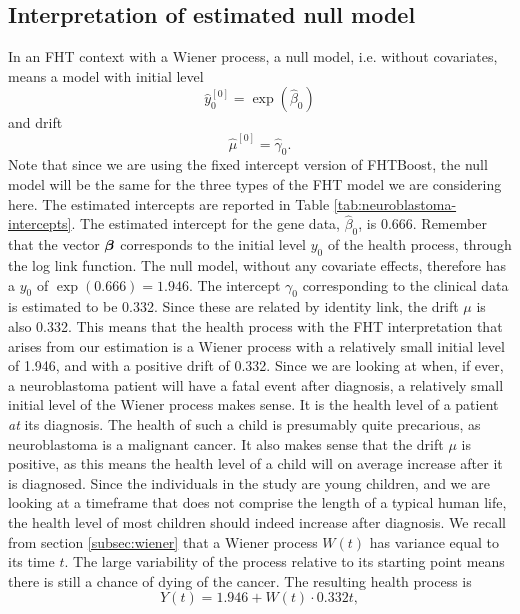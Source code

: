 \subsection{Interpretation of estimated null model}
In an FHT context with a Wiener process, a null model, i.e. without covariates, means a model with initial level
\begin{equation*}
    \hat{y}_0^{[0]}=\exp\left(\hat{\beta}_0\right)
\end{equation*}
and drift
\begin{equation*}
    \hat{\mu}^{[0]}=\hat{\gamma}_0.
\end{equation*}
Note that since we are using the fixed intercept version of FHTBoost, the null model will be the same for the three types of the FHT model we are considering here.
The estimated intercepts are reported in Table \ref{tab:neuroblastoma-intercepts}.
The estimated intercept for the gene data, $\hat{\beta}_0$, is 0.666.
Remember that the vector $\boldsymbol{\beta}$ corresponds to the initial level $y_0$ of the health process, through the log link function.
The null model, without any covariate effects, therefore has a $y_0$ of $\exp(0.666)=1.946$.
The intercept $\gamma_0$ corresponding to the clinical data is estimated to be 0.332.
Since these are related by identity link, the drift $\mu$ is also 0.332.
This means that the health process with the FHT interpretation that arises from our estimation is a Wiener process with a relatively small initial level of 1.946, and with a positive drift of 0.332.
Since we are looking at when, if ever, a neuroblastoma patient will have a fatal event after diagnosis, a relatively small initial level of the Wiener process makes sense.
It is the health level of a patient \textit{at} its diagnosis.
The health of such a child is presumably quite precarious, as neuroblastoma is a malignant cancer.
It also makes sense that the drift $\mu$ is positive, as this means the health level of a child will on average increase after it is diagnosed.
Since the individuals in the study are young children, and we are looking at a timeframe that does not comprise the length of a typical human life, the health level of most children should indeed increase after diagnosis.
We recall from section \ref{subsec:wiener} that a Wiener process $W(t)$ has variance equal to its time $t$.
The large variability of the process relative to its starting point means there is still a chance of dying of the cancer.
The resulting health process is
\begin{equation*}
    Y(t)=1.946+W(t)\cdot0.332t,
\end{equation*}
